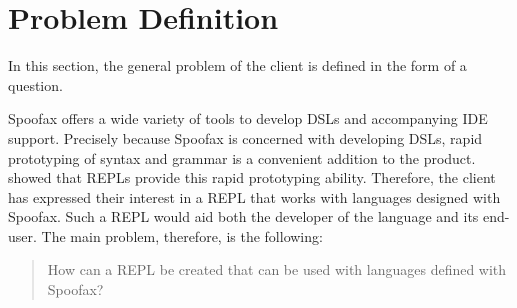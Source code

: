 \section{Problem Definition}
\label{sec:problem-definition}

In this section, the general problem of the client is defined in the
form of a question.

Spoofax offers a wide variety of tools to develop DSLs and accompanying IDE
support. Precisely because Spoofax is concerned with developing DSLs, rapid
prototyping of syntax and grammar is a convenient addition to the product.
 showed that REPLs provide this rapid prototyping
ability.  Therefore, the client has expressed their interest in a REPL that
works with languages designed with Spoofax. Such a REPL would aid both the
developer of the language and its end-user. The main problem, therefore, is the
following:

\begin{quote}
  How can a REPL be created that can be used with languages defined
  with Spoofax?
\end{quote}

